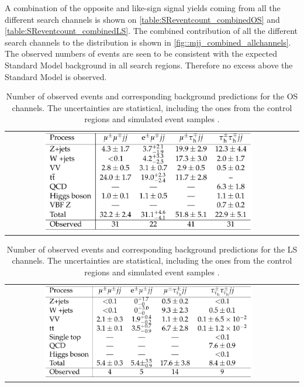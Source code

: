 A combination of the opposite and like-sign signal yields coming from all the different search channels is shown on \autoref{table:SReventcount_combinedOS} and \autoref{table:SReventcount_combinedLS}. The combined contribution of all the different search channels to the \mjj distribution is shown in \autoref{fig::mjj_combined_allchannels}\cite{Khachatryan:2015kxa}. The observed numbers of events are seen to be consistent with the expected Standard Model background in all search regions. Therefore no excess above the Standard Model is observed.

\begin{table}[tbh!]
	\centering
	\begin{tabular}{cc}
		\includegraphics[width=0.75\textwidth]{PLOTS/CMS-SUS-14-005_Table_002.pdf}
	\end{tabular}
	\caption{Number of observed events and corresponding background predictions for the OS channels. The uncertainties are statistical, including the ones from the control regions and simulated event samples \cite{Khachatryan:2015kxa}.}
	\label{table:SReventcount_combinedOS}
\end{table} 

\begin{table}[tbh!]
	\centering
	\begin{tabular}{cc}
		\includegraphics[width=0.75\textwidth]{PLOTS/CMS-SUS-14-005_Table_003.pdf}
	\end{tabular}
	\caption{Number of observed events and corresponding background predictions for the LS channels. The uncertainties are statistical, including the ones from the control regions and simulated event samples \cite{Khachatryan:2015kxa}.}
	\label{table:SReventcount_combinedLS}
\end{table} 

